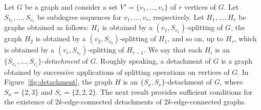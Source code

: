 \documentclass[12pt,reqno,a4paper]{amsart}
\begin{document}
Let $G$ be a graph and consider a set $V'=\{v_1,\ldots,v_r\}$ of $r$
vertices of $G$. Let $S_{v_1},\ldots,S_{v_r}$ be subdegree sequences
for $v_1,\ldots,v_r$, respectively. {Let $H_1,\ldots,H_r$ be graphs
  obtained as follows: $H_1$ is obtained by a
  $(v_1,S_{v_1})$-splitting of $G$, the graph $H_2$ is obtained by a
  $(v_2,S_{v_2})$-splitting of $H_1$, and so on, up to $H_r$, which is
  obtained by a $(v_r,S_{v_r})$-splitting of $H_{r-1}$.} We say that
each $H_i$ is an \emph{$\{S_{v_1},\ldots,S_{v_i}\}$-detachment} of
$G$. 
%
%	
Roughly speaking, a
detachment of $G$ is a graph obtained by successive
applications of splitting operations on vertices of $G$. In
Figure~\ref{fig:detachment}, the graph $H$ is an
$\{S_a,S_e\}$-detachment of $G$, where $S_a=\{2,3\}$ and
$S_e=\{2,2,2\}$. The next result provides sufficient conditions for the existence of
$2k$-edge-connected detachments of $2k$-edge-connected graphs.
\end{document}
